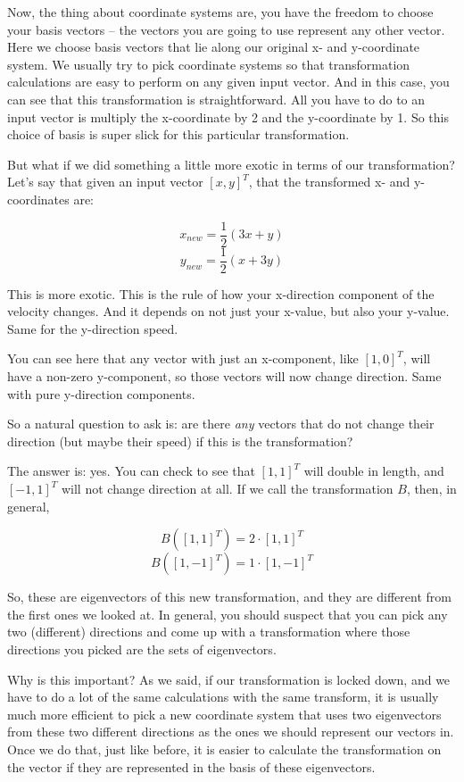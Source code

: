 \documentclass[
]{book}
\begin{document}
Now, the thing about coordinate systems are, you have the freedom to choose your basis vectors -- the vectors you are going to use represent any other vector. Here we choose basis vectors that lie along our original x- and y-coordinate system. We usually try to pick coordinate systems so that transformation calculations are easy to perform on any given input vector. And in this case, you can see that this transformation is straightforward. All you have to do to an input vector is multiply the x-coordinate by 2 and the y-coordinate by 1. So this choice of basis is super slick for this particular transformation.

But what if we did something a little more exotic in terms of our transformation? Let's say that given an input vector \([x, y]^T\), that the transformed x- and y-coordinates are:

\[ x_{new} = \frac{1}{2} (3 x + y)\]
\[ y_{new} = \frac{1}{2} (x + 3 y)\]

This is more exotic. This is the rule of how your x-direction component of the velocity changes. And it depends on not just your x-value, but also your y-value. Same for the y-direction speed.

You can see here that any vector with just an x-component, like \([1, 0]^T\), will have a non-zero y-component, so those vectors will now change direction. Same with pure y-direction components.

So a natural question to ask is: are there \emph{any} vectors that do not change their direction (but maybe their speed) if this is the transformation?

The answer is: yes. You can check to see that \([1, 1]^T\) will double in length, and \([-1,1]^T\) will not change direction at all. If we call the transformation \(B\), then, in general,

\[B([1,1]^T) = 2 \cdot [1,1]^T\]
\[B([1,-1]^T) = 1 \cdot [1,-1]^T\]

So, these are eigenvectors of this new transformation, and they are different from the first ones we looked at. In general, you should suspect that you can pick any two (different) directions and come up with a transformation where those directions you picked are the sets of eigenvectors.

Why is this important? As we said, if our transformation is locked down, and we have to do a lot of the same calculations with the same transform, it is usually much more efficient to pick a new coordinate system that uses two eigenvectors from these two different directions as the ones we should represent our vectors in. Once we do that, just like before, it is easier to calculate the transformation on the vector if they are represented in the basis of these eigenvectors.
\end{document}
